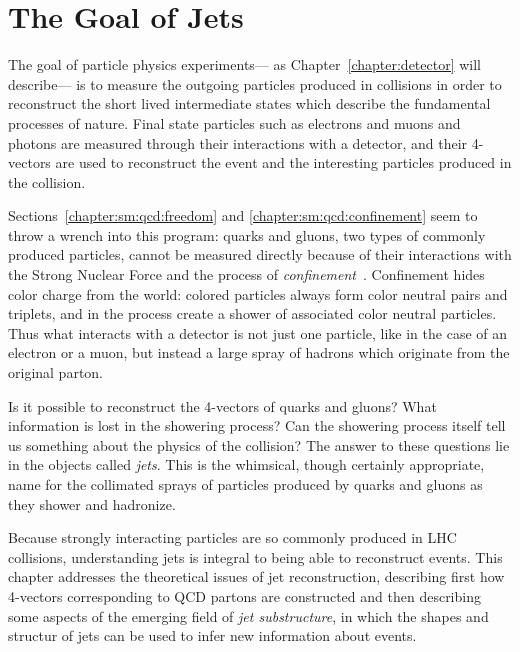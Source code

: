\label{chapter:jets-and-substructure}
\section{The Goal of Jets}

The goal of particle physics experiments--- as Chapter~\ref{chapter:detector} will describe--- is to measure the outgoing particles produced in collisions in order to reconstruct the short lived intermediate states which describe the fundamental processes of nature. Final state particles such as electrons and muons and photons are measured through their interactions with a detector, and their 4-vectors are used to reconstruct the event and the interesting particles produced in the collision. 

Sections~\ref{chapter:sm:qcd:freedom} and \ref{chapter:sm:qcd:confinement} seem to throw a wrench into this program: quarks and gluons, two types of commonly produced particles, cannot be measured directly because of their interactions with the Strong Nuclear Force and the process of \textit{confinement}~\cite{Wilson:1974sk}. Confinement hides color charge from the world: colored particles always form color neutral pairs and triplets, and in the process create a shower of associated color neutral particles. Thus what interacts with a detector is not just one particle, like in the case of an electron or a muon, but instead a large spray of hadrons which originate from the original parton.

Is it possible to reconstruct the 4-vectors of quarks and gluons? What information is lost in the showering process? Can the showering process itself tell us something about the physics of the collision? The answer to these questions lie in the objects called \textit{jets}. This is the whimsical, though certainly appropriate, name for the collimated sprays of particles produced by quarks and gluons as they shower and hadronize. 

Because strongly interacting particles are so commonly produced in LHC collisions, understanding jets is integral to being able to reconstruct events. This chapter addresses the theoretical issues of jet reconstruction, describing first how 4-vectors corresponding to QCD partons are constructed and then describing some aspects of the emerging field of \textit{jet substructure}, in which the shapes and structur of jets can be used to infer new information about events.



